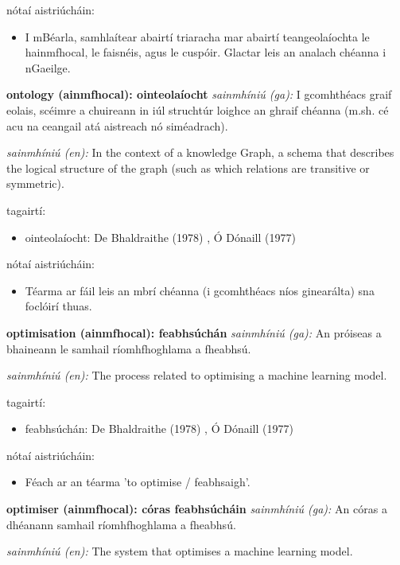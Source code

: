 \documentclass{article}
\begin{document}
nótaí aistriúcháin:
\begin{itemize}
	\item I mBéarla, samhlaítear abairtí triaracha mar abairtí teangeolaíochta le hainmfhocal, le faisnéis, agus le cuspóir. Glactar leis an analach chéanna i nGaeilge.
\end{itemize}


\textbf{ontology (ainmfhocal): ointeolaíocht}
\textit{sainmhíniú (ga):} I gcomhthéacs graif eolais, scéimre a chuireann in iúl struchtúr loighce an ghraif chéanna (m.sh. cé acu na ceangail atá aistreach nó siméadrach).

\textit{sainmhíniú (en):} In the context of a knowledge Graph, a schema that describes the logical structure of the graph (such as which relations are transitive or symmetric).

tagairtí:
\begin{itemize}
	\item ointeolaíocht: De Bhaldraithe (1978) \cite{de-bhaldraithe}, Ó Dónaill (1977) \cite{odonaill}
\end{itemize}

nótaí aistriúcháin:
\begin{itemize}
	\item Téarma ar fáil leis an mbrí chéanna (i gcomhthéacs níos ginearálta) sna foclóirí thuas.
\end{itemize}


\textbf{optimisation (ainmfhocal): feabhsúchán}
\textit{sainmhíniú (ga):} An próiseas a bhaineann le samhail ríomhfhoghlama a fheabhsú.

\textit{sainmhíniú (en):} The process related to optimising a machine learning model.

tagairtí:
\begin{itemize}
	\item feabhsúchán: De Bhaldraithe (1978) \cite{de-bhaldraithe}, Ó Dónaill (1977) \cite{odonaill}
\end{itemize}

nótaí aistriúcháin:
\begin{itemize}
	\item Féach ar an téarma 'to optimise / feabhsaigh'.
\end{itemize}


\textbf{optimiser (ainmfhocal): córas feabhsúcháin}
\textit{sainmhíniú (ga):} An córas a dhéanann samhail ríomhfhoghlama a fheabhsú.

\textit{sainmhíniú (en):} The system that optimises a machine learning model.
\end{document}
